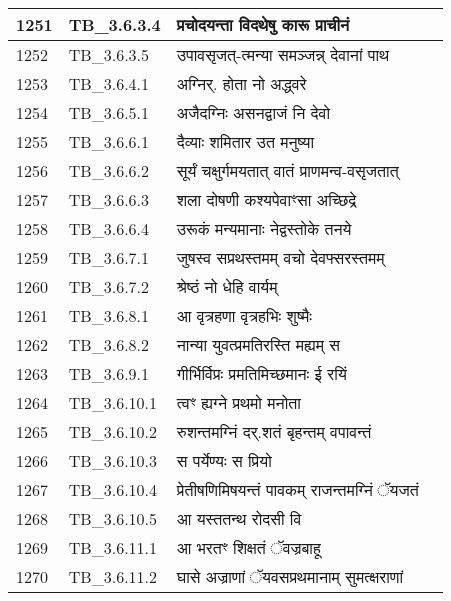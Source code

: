 \documentclass[17pt]{extarticle}
\begin{document}
\begin{longtable}{||p{0.4in}||p{0.9in}||p{4.0in}||p{0.9in}||}
        \hline
            1251 & TB\_3.6.3.4 & प्रचोदयन्ता विदथेषु कारू प्राचीनं &      \\
        \hline
            1252 & TB\_3.6.3.5 & उपावसृजत्{-}त्मन्या समञ्जन्न् देवानां पाथ &      \\
        \hline
            1253 & TB\_3.6.4.1 & अग्निर्. होता नो अद्ध्वरे &      \\
        \hline
            1254 & TB\_3.6.5.1 & अजैदग्निः असनद्वाजं नि देवो &      \\
        \hline
            1255 & TB\_3.6.6.1 & दैव्याः शमितार उत मनुष्या &      \\
        \hline
            1256 & TB\_3.6.6.2 & सूर्यं चक्षुर्गमयतात् वातं प्राणमन्व{-}वसृजतात् &      \\
        \hline
            1257 & TB\_3.6.6.3 & शला दोषणी कश्यपेवाꣳसा अच्छिद्रे &      \\
        \hline
            1258 & TB\_3.6.6.4 & उरूकं मन्यमानाः नेद्वस्तोके तनये &      \\
        \hline
            1259 & TB\_3.6.7.1 & जुषस्व सप्रथस्तमम् वचो देवफ्सरस्तमम् &      \\
        \hline
            1260 & TB\_3.6.7.2 & श्रेष्ठं नो धेहि वार्यम् &      \\
        \hline
            1261 & TB\_3.6.8.1 & आ वृत्रहणा वृत्रहभिः शुष्मैः &      \\
        \hline
            1262 & TB\_3.6.8.2 & नान्या युवत्प्रमतिरस्ति मह्यम् स &      \\
        \hline
            1263 & TB\_3.6.9.1 & गीर्भिर्विप्रः प्रमतिमिच्छमानः ई रयिं &      \\
        \hline
            1264 & TB\_3.6.10.1 & त्वꣳ ह्यग्ने प्रथमो मनोता &      \\
        \hline
            1265 & TB\_3.6.10.2 & रुशन्तमग्निं दर्.शतं बृहन्तम् वपावन्तं &      \\
        \hline
            1266 & TB\_3.6.10.3 & स पर्येण्यः स प्रियो &      \\
        \hline
            1267 & TB\_3.6.10.4 & प्रेतीषणिमिषयन्तं पावकम् राजन्तमग्निं ॅयजतं &      \\
        \hline
            1268 & TB\_3.6.10.5 & आ यस्ततन्थ रोदसी वि &      \\
        \hline
            1269 & TB\_3.6.11.1 & आ भरतꣳ शिक्षतं ॅवज्रबाहू &      \\
        \hline
            1270 & TB\_3.6.11.2 & घासे अज्राणां ॅयवसप्रथमानाम् सुमत्क्षराणां &      \\

\end{longtable}
\end{document}
